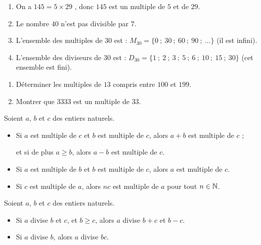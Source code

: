 \documentclass[10pt, a4paper]{article}
\begin{document}
\begin{Exemple}[][5 min]
\begin{enumerate}[leftmargin=*,itemsep=0.5pt]
    \item On a $145 = 5 \times 29$ , donc $145$ est un multiple de $5$ et de $29$.

    \item Le nombre $40$ n'est pas divisible par $7$.

    \item L'ensemble des multiples de $30$ est :
    $M_{30} = \big\{ 0 ~;~ 30 ~;~ 60 ~;~ 90 ~;~ \dots \big\}$ (il est infini).

    \item L'ensemble des diviseurs de $30$ est : $D_{30} = \big\{1~;~2~;~3~;~5~;~6~;~10~;~15~;~30\big\}$ (cet ensemble est fini).
\end{enumerate}
\end{Exemple}


\begin{Application}[][15 min]
\begin{enumerate}[leftmargin=*,itemsep=0.5pt]
    \item Déterminer les multiples de $13$ compris entre $100$ et $199$.
    \item Montrer que $3333$ est un multiple de $33$.
\end{enumerate}
\end{Application}


\iffalse
\begin{Propriete}
Soient $a$, $b$ et $c$ des entiers naturels.
\begin{itemize}[leftmargin=*,itemsep=0.5pt]
  \item Si $a$ est multiple de $c$ et $b$ est multiple de $c$, alors $a + b$ est multiple de $c$ ;

        et si de plus $a \geq b$, alors $a - b$ est multiple de $c$.
  \item Si $a$ est multiple de $b$ et $b$ est multiple de $c$, alors $a$ est multiple de $c$.
  \item Si $c$ est multiple de $a$, alors $nc$ est multiple de $a$ pour tout $n \in \mathbb{N}$.
\end{itemize}
\end{Propriete}

\begin{Propriete}
Soient $a$, $b$ et $c$ des entiers naturels.
\begin{itemize}[leftmargin=*,itemsep=0.5pt]
  \item Si $a$ divise $b$ et $c$, et $b \geq c$, alors $a$ divise $b + c$ et $b - c$.
  \item Si $a$ divise $b$, alors $a$ divise $bc$.
\end{itemize}
\end{Propriete}
\end{document}
